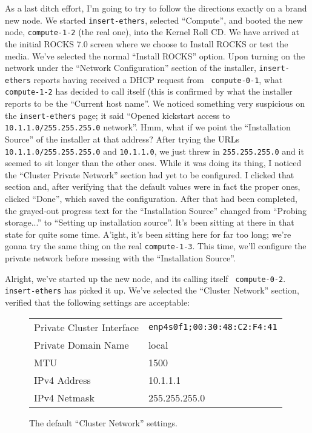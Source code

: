 \documentclass[12pt]{article}
\begin{document}
\qq As a last ditch effort, I'm going to try to follow the directions exactly on
a brand new node. We started {\tt insert-ethers}, selected ``Compute'', and
booted the new node, {\tt compute-1-2} (the real one), into the Kernel Roll
CD. We have arrived at the initial ROCKS 7.0 screen where we choose to Install
ROCKS or test the media. We've selected the normal ``Install ROCKS'' option.
Upon turning on the network under the ``Network Configuration'' section of the
installer, {\tt insert-ethers} reports having received a DHCP request from {\tt
  compute-0-1}, what {\tt compute-1-2} has decided to call itself (this is
confirmed by what the installer reports to be the ``Current host name''.  We
noticed something very suspicious on the {\tt insert-ethers} page; it said
``Opened kickstart access to {\tt 10.1.1.0/255.255.255.0} network''. Hmm, what
if we point the ``Installation Source'' of the installer at that address?  After
trying the URLs {\tt 10.1.1.0/255.255.255.0} and {\tt 10.1.1.0}, we just threw
in {\tt 255.255.255.0} and it seemed to sit longer than the other ones. While it
was doing its thing, I noticed the ``Cluster Private Network'' section had yet
to be configured. I clicked that section and, after verifying that the default
values were in fact the proper ones, clicked ``Done'', which saved the
configuration. After that had been completed, the grayed-out progress text for
the ``Installation Source'' changed from ``Probing storage...'' to ``Setting up
installation source''. It's been sitting at there in that state for quite some
time. A'ight, it's been sitting here for far too long; we're gonna try the same
thing on the real {\tt compute-1-3}. This time, we'll configure the private
network before messing with the ``Installation Source''.

\qq Alright, we've started up the new node, and its calling itself {\tt
  compute-0-2}. {\tt insert-ethers} has picked it up. We've selected the
``Cluster Network'' section, verified that the following settings are
acceptable:

\begin{figure}[H]
  \caption{The default ``Cluster Network'' settings.}
  \begin{tabular}{|l|l|}
    \hline
    Private Cluster Interface & {\tt enp4s0f1;00:30:48:C2:F4:41} \\
    Private Domain Name & local \\
    MTU & 1500 \\
    IPv4 Address & 10.1.1.1 \\
    IPv4 Netmask & 255.255.255.0 \\
    \hline
  \end{tabular}
\end{figure}
\end{document}
